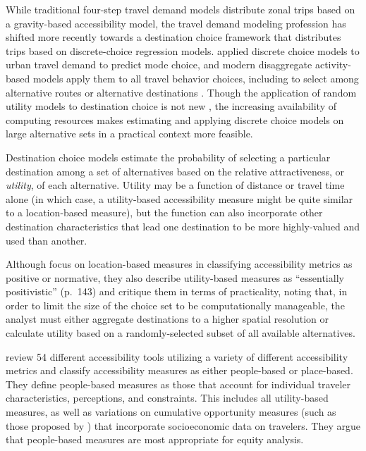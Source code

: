 \documentclass[3p, authoryear, review]{elsarticle} %
\begin{document}
While traditional four-step travel demand models distribute zonal trips based on
a gravity-based accessibility model, the travel demand modeling profession has
shifted more recently towards a destination choice framework that distributes
trips based on discrete-choice regression models. \citet{mcfadden1974measurement} applied
discrete choice models to urban travel demand to predict mode choice, and modern
disaggregate activity-based models apply them to all travel behavior choices,
including to select among alternative routes or alternative destinations
\citep{de2011modelling}. Though the application of random utility models to destination
choice is not new \citep[see][]{anas1983discrete}, the increasing availability of computing
resources makes estimating and applying discrete choice models on large alternative sets
in a practical context more feasible.

Destination choice models estimate the probability of selecting a particular
destination among a set of alternatives based on the relative attractiveness, or
\emph{utility}, of each alternative. Utility may be a function of distance or travel
time alone (in which case, a utility-based accessibility measure might be quite
similar to a location-based measure), but the function can also incorporate
other destination characteristics that lead one destination to be more
highly-valued and used than another.

Although \citet{paez2012measuring} focus on location-based measures in classifying
accessibility metrics as positive or normative, they also describe utility-based
measures as ``essentially positivistic'' (p.~143) and critique them in terms of
practicality, noting that, in order to limit the size of the choice set to be
computationally manageable, the analyst must either aggregate destinations to a higher
spatial resolution or calculate utility based on a randomly-selected subset of all
available alternatives.

\citet{siddiq_tools_2021} review 54 different accessibility tools utilizing a variety of
different accessibility metrics and classify accessibility measures as either
people-based or place-based. They define people-based measures as those that account for
individual traveler characteristics, perceptions, and constraints. This includes all
utility-based measures, as well as variations on cumulative opportunity measures (such
as those proposed by \citet{paez2012measuring}) that incorporate socioeconomic data on
travelers. They argue that people-based measures are most appropriate for equity
analysis.
\end{document}
